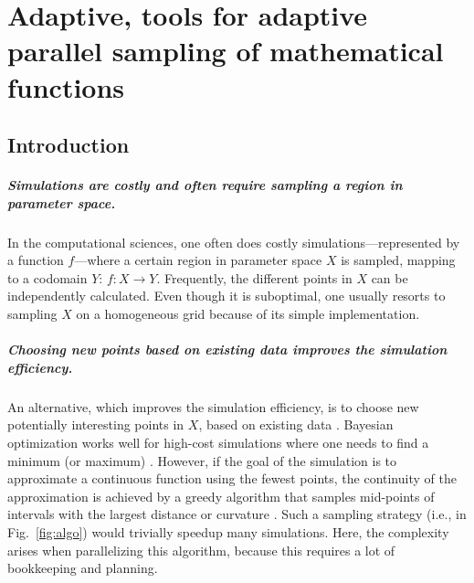 \chapter{Adaptive, tools for adaptive parallel sampling of mathematical functions}
\label{ch:adaptive}

\newpage
\noindent
\hypertarget{introduction}{%
\section{Introduction}\label{introduction}}

\hypertarget{simulations-are-costly-and-often-require-sampling-a-region-in-parameter-space.}{%
\paragraph{Simulations are costly and often require sampling a region in parameter space.}\label{simulations-are-costly-and-often-require-sampling-a-region-in-parameter-space.}}

In the computational sciences, one often does costly simulations---represented by a function $f$---where a certain region in parameter space $X$ is sampled, mapping to a codomain $Y$: $f \colon X \to Y$.
Frequently, the different points in $X$ can be independently calculated.
Even though it is suboptimal, one usually resorts to sampling $X$ on a homogeneous grid because of its simple implementation.

\hypertarget{choosing-new-points-based-on-existing-data-improves-the-simulation-efficiency.}{%
\paragraph{Choosing new points based on existing data improves the simulation efficiency.}\label{choosing-new-points-based-on-existing-data-improves-the-simulation-efficiency.}}

An alternative, which improves the simulation efficiency, is to choose new potentially interesting points in $X$, based on existing data \cite{Gramacy2004, Figueiredo1995, Castro2008, Chen2017}.
Bayesian optimization works well for high-cost simulations where one needs to find a minimum (or maximum) \cite{Takhtaganov2018}.
However, if the goal of the simulation is to approximate a continuous function using the fewest points, the continuity of the approximation is achieved by a greedy algorithm that samples mid-points of intervals with the largest distance or curvature \cite{Wolfram2011}.
Such a sampling strategy (i.e., in Fig.~\ref{fig:algo}) would trivially speedup many simulations.
Here, the complexity arises when parallelizing this algorithm, because this requires a lot of bookkeeping and planning.

